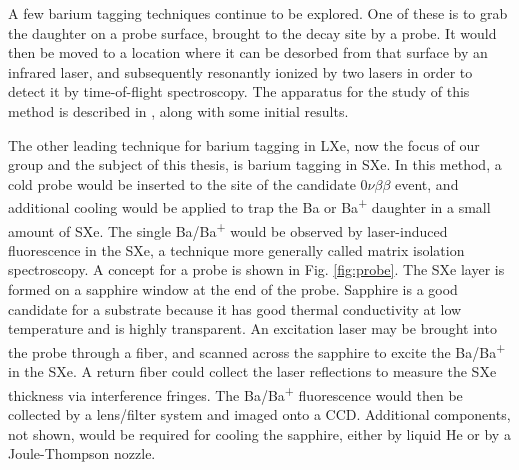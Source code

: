 
A few barium tagging techniques continue to be explored.  One of these is to grab the daughter on a probe surface, brought to the decay site by a probe.  It would then be moved to a location where it can be desorbed from that surface by an infrared laser, and subsequently resonantly ionized by two lasers in order to detect it by time-of-flight spectroscopy.  The apparatus for the study of this method is described in \cite{Twelker2014}, along with some initial results.

The other leading technique for barium tagging in LXe, now the focus of our group and the subject of this thesis, is barium tagging in SXe.  In this method, a cold probe would be inserted to the site of the candidate $0\nu\beta\beta$ event, and additional cooling would be applied to trap the Ba or Ba\textsuperscript{+} daughter in a small amount of SXe.  The single Ba/Ba\textsuperscript{+} would be observed by laser-induced fluorescence in the SXe, a technique more generally called matrix isolation spectroscopy.  A concept for a probe is shown in Fig. \ref{fig:probe}.  The SXe layer is formed on a sapphire window at the end of the probe.  Sapphire is a good candidate for a substrate because it has good thermal conductivity at low temperature and is highly transparent.  An excitation laser may be brought into the probe through a fiber, and scanned across the sapphire to excite the Ba/Ba\textsuperscript{+} in the SXe.  A return fiber could collect the laser reflections to measure the SXe thickness via interference fringes.  The Ba/Ba\textsuperscript{+} fluorescence would then be collected by a lens/filter system and imaged onto a CCD.  Additional components, not shown, would be required for cooling the sapphire, either by liquid He or by a Joule-Thompson nozzle.

